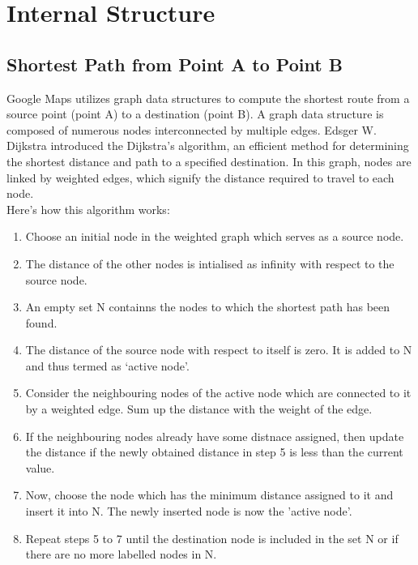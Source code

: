 \documentclass[10pt,oneside,english,a4paper]{article}
\begin{document}
\section{Internal Structure} \label{internal}

\subsection{Shortest Path from Point A to Point B} \label{internal:dijikstra}
Google Maps utilizes graph data structures to compute the shortest route from a source point (point A) to a destination (point B). A graph data structure is composed of numerous nodes interconnected by multiple edges. Edsger W. Dijkstra introduced the Dijkstra's algorithm, an efficient method for determining the shortest distance and path to a specified destination. In this graph, nodes are linked by weighted edges, which signify the distance required to travel to each node. 
\\Here's how this algorithm works\cite{Mehta2019}:

\begin{enumerate}
	\item Choose an initial node in the weighted graph which serves as a source node.
	\item The distance of the other nodes is intialised as infinity with respect to the source node. 
	\item An empty set N containns the nodes to which the shortest path has been found. 
	\item The distance of the source node with respect to itself is zero. It is added to N and thus termed as ‘active node’. 
	\item Consider the neighbouring nodes of the active node which are connected to it by a weighted edge. Sum up the distance with the weight of the edge. 
	\item If the neighbouring nodes already have some distnace assigned, then update the distance if the newly obtained distance in step 5 is less than the current value. 
	\item Now, choose the node which has the minimum distance assigned to it and insert it into N. The newly inserted node is now the ’active node’. 
	\item Repeat steps 5 to 7 until the destination node is included in the set N or if there are no more labelled nodes in N.
	
\end{enumerate}
\end{document}

